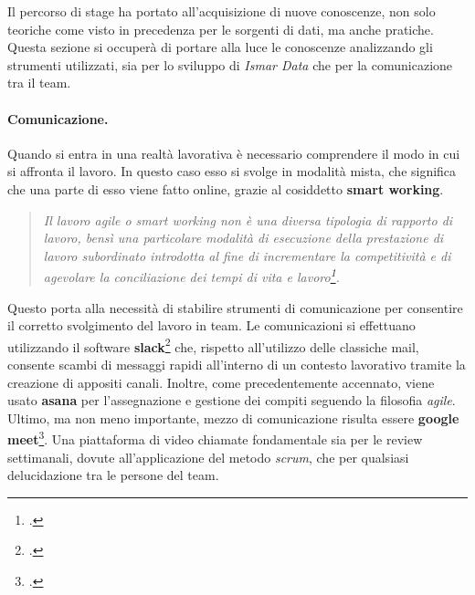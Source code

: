 \documentclass[./main.tex]{subfiles}
\begin{document}
Il percorso di stage ha portato all'acquisizione di nuove conoscenze, non solo teoriche come visto in precedenza per le sorgenti di dati, ma anche pratiche. Questa sezione si occuperà di portare alla luce le conoscenze analizzando gli strumenti utilizzati, sia per lo sviluppo di \textit{Ismar Data} che per la comunicazione tra il team.\par

\paragraph{Comunicazione.}

Quando si entra in una realtà lavorativa è necessario comprendere il modo in cui si affronta il lavoro. In questo caso esso si svolge in modalità mista, che significa che una parte di esso viene fatto online, grazie al cosiddetto \textbf{smart working}.\par

\begin{quote}
\textit{Il lavoro agile o smart working non è una diversa tipologia di rapporto di lavoro, bensì una particolare modalità di esecuzione della prestazione di lavoro subordinato introdotta al fine di incrementare la competitività e di agevolare la conciliazione dei tempi di vita e lavoro\footcite[\url{https://www.lavoro.gov.it/strumenti-e-servizi/smart-working/Pagine/default}]{website-smartworking-ministero-lavoro}.}
\end{quote}

Questo porta alla necessità di stabilire strumenti di comunicazione per consentire il corretto svolgimento del lavoro in team. Le comunicazioni si effettuano utilizzando il software \textbf{slack}\footcite[\url{https://slack.com/intl/it-it/}]{website-slack} che, rispetto all'utilizzo delle classiche mail, consente scambi di messaggi rapidi all'interno di un contesto lavorativo tramite la creazione di appositi canali. Inoltre, come precedentemente accennato, viene usato \textbf{asana} per l'assegnazione e gestione dei compiti seguendo la filosofia \textit{agile}. Ultimo, ma non meno importante, mezzo di comunicazione risulta essere \textbf{google meet}\footcite[\url{https://meet.google.com/}]{website-google-meet}. Una piattaforma di video chiamate fondamentale sia per le review settimanali, dovute all'applicazione del metodo \textit{scrum}, che per qualsiasi delucidazione tra le persone del team.\par
\end{document}
